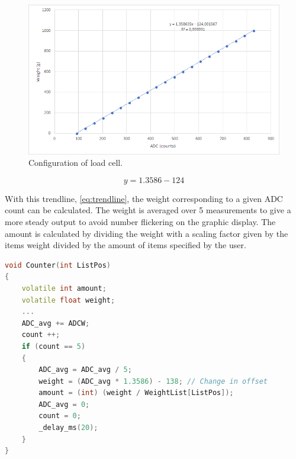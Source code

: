 \begin{figure}[H]
	\centering
	\includegraphics[width=0.67\linewidth]{graphics/loadcellconfig}
	\caption{Configuration of load cell.}
	\label{fig:loadcellconfig}
\end{figure}
\vspace{-25pt}
\begin{equation}
y = 1.3586-124
\label{eq:trendline}
\end{equation}

With this trendline, \cref{eq:trendline}, the weight corresponding to a given ADC count can be calculated.
The weight is averaged over 5 measurements to give a more steady output to avoid number flickering on the graphic display.
The amount is calculated by dividing the weight with a scaling factor given by the items weight divided by the amount of items specified by the user. 
\vspace{-15pt}
\begin{lstlisting}[caption={Amount of items calculated with use of the trendline.}, label={lst:counter},language=C++,directivestyle={\color{black}},
emph={int,char,double,float,unsigned},emphstyle={\color{blue}}]
void Counter(int ListPos)
{
	volatile int amount;
	volatile float weight;
	...
	ADC_avg += ADCW;
	count ++;
	if (count == 5)
	{
	    ADC_avg = ADC_avg / 5;
	    weight = (ADC_avg * 1.3586) - 138; // Change in offset
	    amount = (int) (weight / WeightList[ListPos]);
	    ADC_avg = 0;
	    count = 0;
	    _delay_ms(20);
	}
}
\end{lstlisting}
